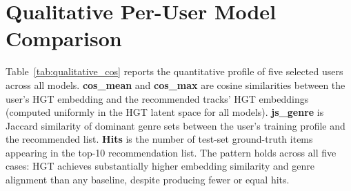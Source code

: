 \section{Qualitative Per-User Model Comparison}
\label{sec:qualitative_table}

Table~\ref{tab:qualitative_cos} reports the quantitative profile of five selected users across all models. \textbf{cos\_mean} and \textbf{cos\_max} are cosine similarities between the user's HGT embedding and the recommended tracks' HGT embeddings (computed uniformly in the HGT latent space for all models). \textbf{js\_genre} is Jaccard similarity of dominant genre sets between the user's training profile and the recommended list. \textbf{Hits} is the number of test-set ground-truth items appearing in the top-10 recommendation list. The pattern holds across all five cases: HGT achieves substantially higher embedding similarity and genre alignment than any baseline, despite producing fewer or equal hits.

